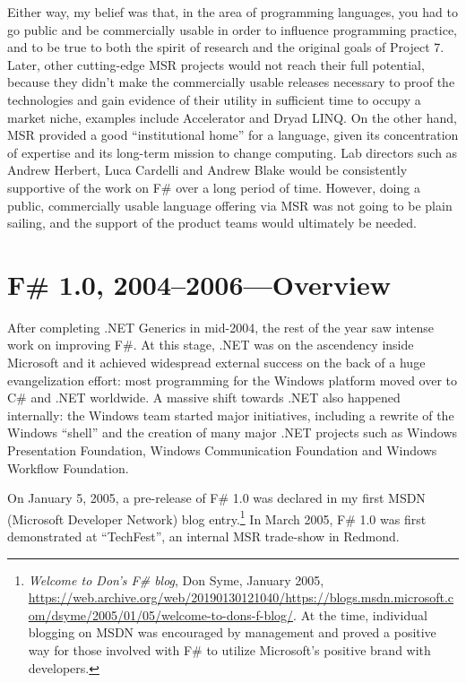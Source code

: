 \documentclass[acmsmall]{acmart}\settopmatter{}
\begin{document}
Either way, my belief was that, in the area of programming languages, you had to go public and be commercially usable in order to influence
programming practice, and to be true to both the spirit of research and the original goals of Project 7. Later, other cutting-edge MSR
projects would not reach their full potential, because they didn’t make the commercially usable releases necessary to proof the technologies
and gain evidence of their utility in sufficient time to occupy a market niche, examples include Accelerator and Dryad LINQ. On the other
hand, MSR provided a good “institutional home” for a language, given its concentration of expertise and its long-term mission to change
computing. Lab directors such as Andrew Herbert, Luca Cardelli and Andrew Blake would be consistently supportive of the work
on F\# over a long period of time. However, doing a public, commercially usable language offering via MSR was not going to be plain
sailing, and the support of the product teams would ultimately be needed.

\section*{F\# 1.0, 2004--2006---Overview}

After completing .NET Generics in mid-2004, the rest of the year saw intense work on improving F\#. At this stage, .NET was on the
ascendency inside Microsoft and it achieved widespread external success on the back of a huge evangelization effort: most programming
for the Windows platform moved over to C\# and .NET worldwide. A massive shift towards .NET also happened internally: the Windows
team started major initiatives, including a rewrite of the Windows “shell” and the creation of many major .NET projects such as Windows
Presentation Foundation, Windows Communication Foundation and Windows Workflow Foundation.

On January 5, 2005, a pre-release of F\# 1.0 was declared in my first MSDN (Microsoft Developer Network) blog entry.\footnote{\textit{Welcome to Don’s F\# blog}, Don Syme, January 2005, \url{https://web.archive.org/web/20190130121040/https://blogs.msdn.microsoft.com/dsyme/2005/01/05/welcome-to-dons-f-blog/}. At the time, individual blogging on MSDN was encouraged by management and proved a positive way for those involved with F\# to utilize Microsoft’s positive brand with developers.}  In March 2005, F\# 1.0 was first demonstrated at “TechFest”, an internal MSR trade-show in Redmond.  
\end{document}
